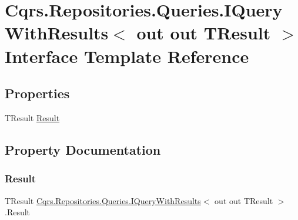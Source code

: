 \hypertarget{interfaceCqrs_1_1Repositories_1_1Queries_1_1IQueryWithResults}{}\section{Cqrs.\+Repositories.\+Queries.\+I\+Query\+With\+Results$<$ out out T\+Result $>$ Interface Template Reference}
\label{interfaceCqrs_1_1Repositories_1_1Queries_1_1IQueryWithResults}
\subsection*{Properties}
\begin{DoxyCompactItemize}
\item 
T\+Result \hyperlink{interfaceCqrs_1_1Repositories_1_1Queries_1_1IQueryWithResults_a54dc0f77254920505e4bc9793bb32b1a}{Result}
\end{DoxyCompactItemize}


\subsection{Property Documentation}
\mbox{\label{interfaceCqrs_1_1Repositories_1_1Queries_1_1IQueryWithResults_a54dc0f77254920505e4bc9793bb32b1a}} 
\subsubsection{\texorpdfstring{Result}{Result}}
{\footnotesize\ttfamily T\+Result \hyperlink{interfaceCqrs_1_1Repositories_1_1Queries_1_1IQueryWithResults}{Cqrs.\+Repositories.\+Queries.\+I\+Query\+With\+Results}$<$ out out T\+Result $>$.Result\hspace{0.3cm}{\ttfamily [get]}}

